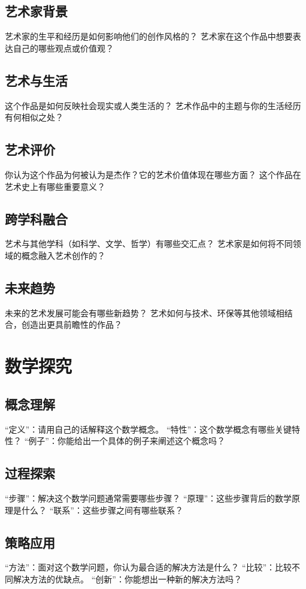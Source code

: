 \documentclass[12pt]{book}
\begin{document}
\subsection{艺术家背景}
艺术家的生平和经历是如何影响他们的创作风格的？
艺术家在这个作品中想要表达自己的哪些观点或价值观？

\subsection{艺术与生活}
这个作品是如何反映社会现实或人类生活的？
艺术作品中的主题与你的生活经历有何相似之处？

\subsection{艺术评价}
你认为这个作品为何被认为是杰作？它的艺术价值体现在哪些方面？
这个作品在艺术史上有哪些重要意义？

\subsection{跨学科融合}
艺术与其他学科（如科学、文学、哲学）有哪些交汇点？
艺术家是如何将不同领域的概念融入艺术创作的？

\subsection{未来趋势}
未来的艺术发展可能会有哪些新趋势？
艺术如何与技术、环保等其他领域相结合，创造出更具前瞻性的作品？


\section{数学探究}
\subsection{概念理解}

“定义”：请用自己的话解释这个数学概念。
“特性”：这个数学概念有哪些关键特性？
“例子”：你能给出一个具体的例子来阐述这个概念吗？

\subsection{过程探索}
“步骤”：解决这个数学问题通常需要哪些步骤？
“原理”：这些步骤背后的数学原理是什么？
“联系”：这些步骤之间有哪些联系？

\subsection{策略应用}
“方法”：面对这个数学问题，你认为最合适的解决方法是什么？
“比较”：比较不同解决方法的优缺点。
“创新”：你能想出一种新的解决方法吗？
\end{document}

